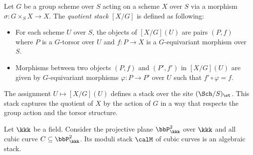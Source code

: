     \begin{construction}\label{const:quotient_stack_of_schemes}
        Let \(G\) be a group scheme over \(S\) acting on a scheme \(X\) over \(S\) via a morphism \(\sigma: G \times_S X \to X\).
        The \emph{quotient stack} \([X/G]\) is defined as following:
        \begin{itemize}
            \item For each scheme \(U\) over \(S\), the objects of \([X/G](U)\) are pairs \((P, f)\) where \(P\) is a \(G\)-torsor over \(U\) and \(f: P \to X\) is a \(G\)-equivariant morphism over \(S\).
            \item Morphisms between two objects \((P, f)\) and \((P', f')\) in \([X/G](U)\) are given by \(G\)-equivariant morphisms \(\varphi: P \to P'\) over \(U\) such that \(f' \circ \varphi = f\).
        \end{itemize}

        The assignment \(U \mapsto [X/G](U)\) defines a stack over the site \((\Sch/S)_{\et}\).
        This stack captures the quotient of \(X\) by the action of \(G\) in a way that respects the group action and the torsor structure.
    \end{construction}


    \begin{example}\label{eg:cubic_curve_in_projective_plane_as_algebraic_stacks}
        Let \(\kkk\) be a field. 
        Consider the projective plane \(\bbP^2_\kkk\) over \(\kkk\) and all cubic curve \(C \subseteq \bbP^2_\kkk\).
        Its moduli stack \(\calM\) of cubic curves is an algebraic stack.
    \end{example}
